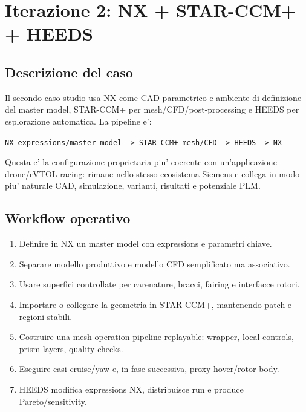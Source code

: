 
\chapter{Iterazione 2: NX + STAR-CCM+ + HEEDS}
\label{cap:iter2-nx}

\section{Descrizione del caso}

Il secondo caso studio usa NX come CAD parametrico e ambiente di definizione del master model, STAR-CCM+ per mesh/CFD/post-processing e HEEDS per esplorazione automatica. La pipeline e':

\begin{center}
\texttt{NX expressions/master model -> STAR-CCM+ mesh/CFD -> HEEDS -> NX}
\end{center}

Questa e' la configurazione proprietaria piu' coerente con un'applicazione drone/eVTOL racing: rimane nello stesso ecosistema Siemens e collega in modo piu' naturale CAD, simulazione, varianti, risultati e potenziale PLM.

\section{Workflow operativo}

\begin{enumerate}
    \item Definire in NX un master model con expressions e parametri chiave.
    \item Separare modello produttivo e modello CFD semplificato ma associativo.
    \item Usare superfici controllate per carenature, bracci, fairing e interfacce rotori.
    \item Importare o collegare la geometria in STAR-CCM+, mantenendo patch e regioni stabili.
    \item Costruire una mesh operation pipeline replayable: wrapper, local controls, prism layers, quality checks.
    \item Eseguire casi cruise/yaw e, in fase successiva, proxy hover/rotor-body.
    \item HEEDS modifica expressions NX, distribuisce run e produce Pareto/sensitivity.
\end{enumerate}

